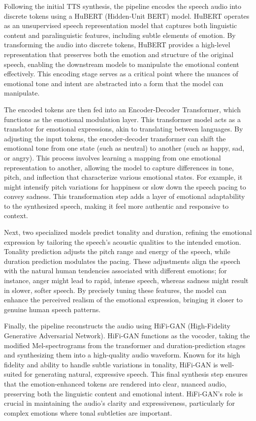 Following the initial TTS synthesis, the pipeline encodes the speech audio into discrete tokens using a HuBERT (Hidden-Unit BERT) model. HuBERT operates as an unsupervised speech representation model that captures both linguistic content and paralinguistic features, including subtle elements of emotion. By transforming the audio into discrete tokens, HuBERT provides a high-level representation that preserves both the emotion and structure of the original speech, enabling the downstream models to manipulate the emotional content effectively. This encoding stage serves as a critical point where the nuances of emotional tone and intent are abstracted into a form that the model can manipulate.

The encoded tokens are then fed into an Encoder-Decoder Transformer, which functions as the emotional modulation layer. This transformer model acts as a translator for emotional expressions, akin to translating between languages. By adjusting the input tokens, the encoder-decoder transformer can shift the emotional tone from one state (such as neutral) to another (such as happy, sad, or angry). This process involves learning a mapping from one emotional representation to another, allowing the model to capture differences in tone, pitch, and inflection that characterize various emotional states. For example, it might intensify pitch variations for happiness or slow down the speech pacing to convey sadness. This transformation step adds a layer of emotional adaptability to the synthesized speech, making it feel more authentic and responsive to context.

Next, two specialized models predict tonality and duration, refining the emotional expression by tailoring the speech’s acoustic qualities to the intended emotion. Tonality prediction adjusts the pitch range and energy of the speech, while duration prediction modulates the pacing. These adjustments align the speech with the natural human tendencies associated with different emotions; for instance, anger might lead to rapid, intense speech, whereas sadness might result in slower, softer speech. By precisely tuning these features, the model can enhance the perceived realism of the emotional expression, bringing it closer to genuine human speech patterns.

Finally, the pipeline reconstructs the audio using HiFi-GAN (High-Fidelity Generative Adversarial Network). HiFi-GAN functions as the vocoder, taking the modified Mel-spectrograms from the transformer and duration-prediction stages and synthesizing them into a high-quality audio waveform. Known for its high fidelity and ability to handle subtle variations in tonality, HiFi-GAN is well-suited for generating natural, expressive speech. This final synthesis step ensures that the emotion-enhanced tokens are rendered into clear, nuanced audio, preserving both the linguistic content and emotional intent. HiFi-GAN’s role is crucial in maintaining the audio’s clarity and expressiveness, particularly for complex emotions where tonal subtleties are important.


